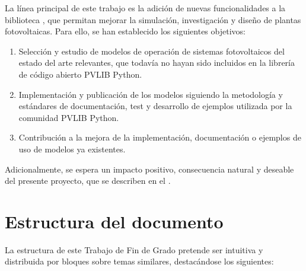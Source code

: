 La línea principal de este trabajo es la adición de nuevas funcionalidades a la biblioteca \pvlibpy{}, que permitan mejorar la simulación, investigación y diseño de plantas fotovoltaicas. Para ello, se han establecido los siguientes objetivos:

\begin{enumerate}

    \item Selección y estudio de modelos de operación de sistemas fotovoltaicos del estado del arte relevantes, que todavía no hayan sido incluidos en la librería de código abierto PVLIB Python.

    \item Implementación y publicación de los modelos siguiendo la metodología y estándares de documentación, test y desarrollo de ejemplos utilizada por la comunidad PVLIB Python.

    \item Contribución a la mejora de la implementación, documentación o ejemplos de uso de modelos ya existentes.

\end{enumerate}

Adicionalmente, se espera un impacto positivo, consecuencia natural y deseable del presente proyecto, que se describen en el .


\section{Estructura del documento} \label{sct:intro_estructura}

La estructura de este Trabajo de Fin de Grado pretende ser intuitiva y distribuida por bloques sobre temas similares, destacándose los siguientes:

